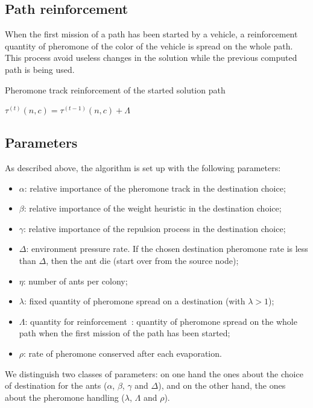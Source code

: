 \documentclass[a4paper,10pt]{article}
\begin{document}
\subsection{Path reinforcement}
When the first mission of a path has been started by a vehicle, a reinforcement quantity of pheromone of the color of the vehicle is spread on the whole path. This process avoid useless changes in the solution while the previous computed path is being used.


\begin{algorithm}
\caption{Pheromone track reinforcement of the started solution path}
\begin{algorithmic} 
\label{algoReinforcement}
\STATE $\tau^{(t)}(n,c) =  \tau^{(t-1)}(n,c) + \Lambda$
\ENDFOR
\end{algorithmic}
\end{algorithm}

\subsection{Parameters}
As described above, the algorithm is set up with the following parameters:

\begin{itemize}
 \item $\alpha$: relative importance of the pheromone track in the destination choice;
 \item $\beta$:  relative importance of the weight heuristic in the destination choice;
 \item $\gamma$: relative importance of the repulsion process in the destination choice;
 \item $\Delta$: environment pressure rate. If the chosen destination pheromone rate is less than $\Delta$, then the ant die (start over from the source node);
 \item $\eta$: number of ants per colony;
 \item $\lambda$: fixed quantity of pheromone spread on a destination (with $\lambda > 1$);
 \item $\Lambda$: quantity for reinforcement : quantity of pheromone spread on the whole path when the first mission of the path has been started;
 \item $\rho$: rate of pheromone conserved after each evaporation.
\end{itemize}

We distinguish two classes of parameters: on one hand the ones about the choice of destination for the ants ($\alpha$, $\beta$, $\gamma$ and $\Delta$), and on the other hand, the ones about the pheromone handling ($\lambda$, $\Lambda$ and $\rho$).\\
\end{document}
